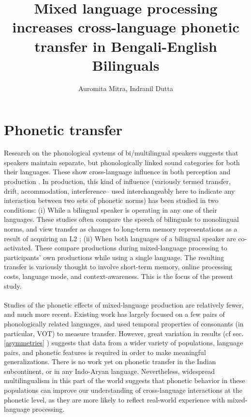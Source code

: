 \documentclass[11pt]{article}
\title{Mixed language processing increases cross-language phonetic transfer in Bengali-English Bilinguals}
\date{}
\author{Auromita Mitra, Indranil Dutta}
\begin{document}
\maketitle
	
%

\section{Phonetic transfer}

Research on the phonological systems of bi/multilingual speakers suggests that speakers maintain separate, but phonologically linked sound categories for both their languages. These show cross-language influence in both perception and production
. In production, this kind of influence (variously termed transfer, drift, accommodation, interference-- used interchangeably here to indicate any interaction between two sets of phonetic norms) has been studied in two conditions:
(i) While a bilingual speaker is operating in any one of their languages. These studies often compare the speech of bilinguals to monolingual norms, and view transfer as changes to long-term memory representations as a result of acquiring an L2 \cite{guion2003vowel,caramazza1973acquisition,flege1987production}; (ii) When both languages of a bilingual speaker are co-activated. These compare productions during mixed-language processing to participants' own productions while using a single language. The resulting transfer is variously thought to involve short-term memory, online processing costs, language mode, and context-awareness. This is the focus of the present study. 

\paragraph{}Studies of the phonetic effects of mixed-language production are relatively fewer, and much more recent. Existing work has largely focused on a few pairs of phonologically related languages, and used temporal properties of consonants (in particular, VOT) to measure transfer. However, great variation in results (cf sec.\ref{asymmetries} ) suggests that data from a wider variety of populations, language pairs,  and phonetic features is required in order to make meaningful generalizations. There is no work yet on phonetic transfer in the Indian subcontinent, or in any Indo-Aryan language. Nevertheless, widespread multilingualism in this part of the world suggests that phonetic
behavior in these populations can improve our understanding of cross-language interactions at the phonetic level, as they are more likely to reflect real-world experience with mixed-language processing.
\end{document}
